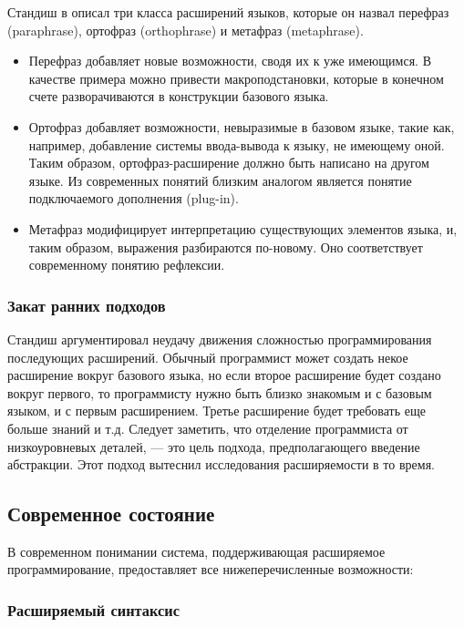 \documentclass[a4paper,12pt,titlepage]{extarticle}
\begin{document}
Стандиш в \cite{Stan75} описал три класса расширений языков, которые он назвал
перефраз (paraphrase), ортофраз (orthophrase) и метафраз (metaphrase).
\begin{itemize}
  \item Перефраз добавляет новые возможности, сводя их к уже имеющимся. В
  качестве примера можно привести макроподстановки, которые в конечном счете
  разворачиваются в конструкции базового языка.
  \item Ортофраз добавляет возможности, невыразимые в базовом языке, такие как,
  например, добавление системы ввода-вывода к языку, не имеющему оной. Таким
  образом, ортофраз-расширение должно быть написано на другом языке. Из
  современных понятий близким аналогом является понятие подключаемого дополнения
  (plug-in).
  \item Метафраз модифицирует интерпретацию существующих элементов языка, и,
  таким образом, выражения разбираются по-новому. Оно соответствует
  современному понятию рефлексии.
\end{itemize}

\subsubsection*{Закат ранних подходов}

Стандиш аргументировал неудачу движения сложностью программирования последующих
расширений. Обычный программист может создать некое расширение вокруг базового
языка, но если второе расширение будет создано вокруг первого, то программисту
нужно быть близко знакомым и с базовым языком, и с первым расширением. Третье
расширение будет требовать еще больше знаний и т.д. Следует заметить, что
отделение программиста от низкоуровневых деталей, --- это цель подхода,
предполагающего введение абстракции. Этот подход вытеснил исследования
расширяемости в то время.

\subsection{Современное состояние}
\label{modernextsys}

В современном понимании система, поддерживающая расширяемое программирование,
предоставляет все нижеперечисленные возможности:

\subsubsection*{Расширяемый синтаксис}
\end{document}
